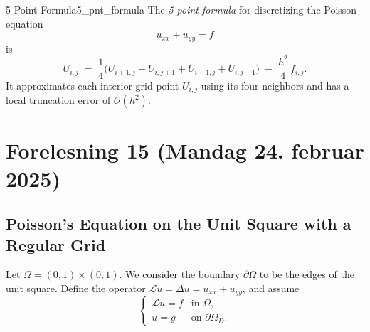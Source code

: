 \begin{definition}{5-Point Formula}{5_pnt_formula}
  The \emph{5-point formula} for discretizing the Poisson equation
  \[
    u_{xx} + u_{yy} = f
  \]
  is
  \[
    U_{i,j}
    \;=\;
    \frac{1}{4}
    \bigl(U_{i+1,j} + U_{i,j+1} + U_{i-1,j} + U_{i,j-1}\bigr)
    \;-\;
    \frac{h^2}{4}\,f_{i,j}.
  \]
  It approximates each interior grid point \(U_{i,j}\) using its four neighbors and has a local truncation error of \(\mathcal{O}(h^2)\).
\end{definition}
\section{Forelesning 15 (Mandag 24. februar 2025)}
\subsection{Poisson's Equation on the Unit Square with a Regular Grid}

Let \(\Omega = (0,1)\times(0,1)\). We consider the boundary \(\partial\Omega\) to be the edges of the unit square. Define the operator \(\mathcal{L}u = \Delta u = u_{xx} + u_{yy}\), and assume
\[
  \begin{cases}
    \mathcal{L}u = f & \text{in } \Omega,           \\
    u = g            & \text{on } \partial\Omega_D.
  \end{cases}
\]

